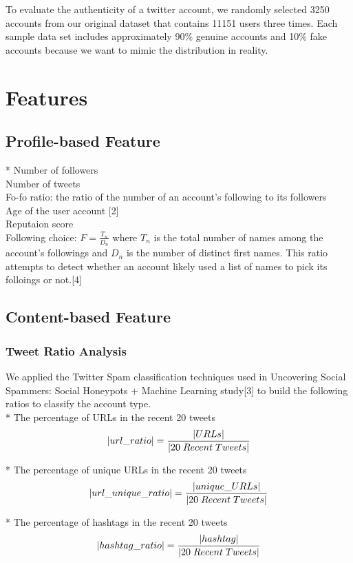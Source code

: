 \documentclass[a4paper, twoside, 12pt]{report}
\DeclarePairedDelimiter\abs{\lvert}{\rvert}%
\begin{document}
\noindent To evaluate the authenticity of a twitter account, we randomly selected 3250 accounts from our original dataset that contains 11151 users three times. Each sample data set includes approximately 90\% genuine accounts and 10\% fake accounts because we want to mimic the distribution in reality.

\section{Features}
\subsection{Profile-based Feature}
* Number of followers\\
\noindent* Number of tweets\\
\noindent* Fo-fo ratio: the ratio of the number of an account's following to its followers\\
\noindent* Age of the user account [2]\\
\noindent* Reputaion score\\
\noindent* Following choice: $F=\frac{T_n}{D_n}$ where $T_n$ is the total number of names among the account's followings and $D_n$ is the number of distinct first names. This ratio attempts to detect whether an account likely used a list of names to pick its folloings or not.[4]


\subsection{Content-based Feature}

\subsubsection{Tweet Ratio Analysis}
We applied the Twitter Spam classification techniques used in Uncovering Social Spammers: Social Honeypots + Machine Learning study[3] to build the following ratios to classify the account type.\\

* The percentage of URLs in the recent 20 tweets
\[\abs{url\_ratio} = \dfrac{\abs{URLs}}{\abs{20 \; Recent \;Tweets}}\]

* The percentage of unique URLs in the recent 20 tweets
\[\abs{url\_unique\_ratio} = \dfrac{\abs{unique\_URLs}}{\abs{20 \; Recent \;Tweets}}\]

* The percentage of hashtags in the recent 20 tweets
\[\abs{hashtag\_ratio} = \dfrac{\abs{hashtag}}{\abs{20 \; Recent \;Tweets}}\]
\end{document}
